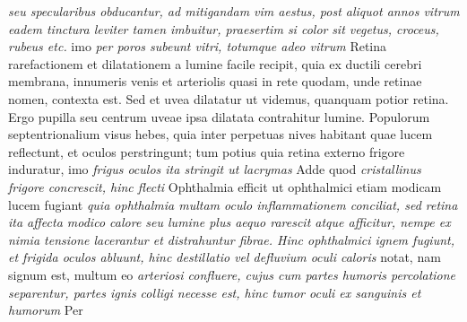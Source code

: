 \textit{seu specularibus obducantur, ad mitigandam vim aestus, post aliquot annos vitrum eadem tinctura leviter tamen imbuitur, praesertim si color}
\textit{sit vegetus\protect{}, croceus\protect{}, rubeus\protect{} etc.}
imo \textit{per poros subeunt vitri, totumque adeo vitrum}
\textit{}
Retina rarefactionem et dilatationem a lumine facile recipit, quia ex ductili cerebri membrana, innumeris venis et arteriolis\protect{} quasi in rete quodam, unde retinae nomen, contexta est. Sed et uvea dilatatur ut videmus, quanquam potior retina. Ergo pupilla seu centrum uveae ipsa dilatata contrahitur lumine. Populorum septentrionalium visus hebes, quia inter perpetuas nives habitant quae lucem reflectunt, et oculos perstringunt; tum potius quia retina externo frigore induratur, imo \textit{frigus oculos ita stringit ut lacrymas } Adde quod \textit{cristallinus frigore concrescit, hinc flecti } Ophthalmia\protect{} efficit ut ophthalmici etiam modicam lucem fugiant
\textit{quia ophthalmia multam oculo inflammationem conciliat, sed retina ita affecta modico calore seu lumine plus aequo rarescit atque afficitur, nempe ex nimia tensione lacerantur et distrahuntur fibrae. Hinc ophthalmici ignem fugiunt, et frigida oculos abluunt, hinc destillatio\protect{} vel defluvium\protect{} oculi caloris
}
notat, nam signum est, multum eo  \textit{arteriosi confluere, cujus cum partes humoris percolatione separentur, partes ignis colligi necesse est, hinc tumor oculi ex sanguinis et humorum } Per
